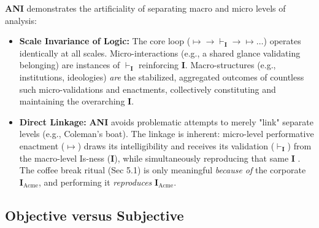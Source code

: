 \documentclass{article}
\newcommand{\ANI}{\textbf{ANI}}             %
\newcommand{\Isness}{\mathbf{I}}            %
\newcommand{\enactment}{\ensuremath{\mapsto}} %
\newcommand{\validates}[1]{\ensuremath{\vdash_{#1}}} %
\begin{document}
\ANI{} demonstrates the artificiality of separating macro and micro levels of analysis:
\begin{itemize}
    \item \textbf{Scale Invariance of Logic:} The core loop ($\enactment \rightarrow \validates{\Isness} \rightarrow \enactment \dots$) operates identically at all scales. Micro-interactions (e.g., a shared glance validating belonging) are instances of $\validates{\Isness}$ reinforcing $\Isness$. Macro-structures (e.g., institutions, ideologies) \textit{are} the stabilized, aggregated outcomes of countless such micro-validations and enactments, collectively constituting and maintaining the overarching $\Isness$.
    \item \textbf{Direct Linkage:} \ANI{} avoids problematic attempts to merely "link" separate levels (e.g., Coleman's boat). The linkage is inherent: micro-level performative enactment ($\enactment$) draws its intelligibility and receives its validation ($\validates{\Isness}$) from the macro-level Is-ness ($\Isness$), while simultaneously reproducing that same $\Isness$ \citep{Giddens1984}. The coffee break ritual (Sec 5.1) is only meaningful \textit{because of} the corporate $\Isness_{\text{Acme}}$, and performing it \textit{reproduces} $\Isness_{\text{Acme}}$.
\end{itemize}

\subsection{Objective versus Subjective}
\end{document}
